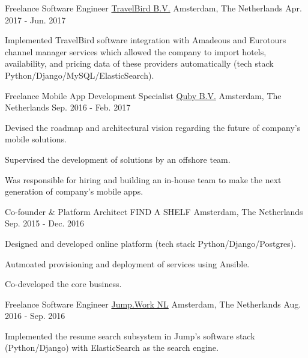 \begin{cventries}
  \cventry
    {Freelance Software Engineer} %
    {\href{https://travelbird.nl/}{TravelBird B.V.}} %
    {Amsterdam, The Netherlands} %
    {Apr. 2017 - 	Jun. 2017} %
    {
      \begin{cvitems} %
        \item {Implemented TravelBird software integration with Amadeous and Eurotours channel manager services which allowed the company to import hotels, availability, and pricing data of these providers automatically (tech stack Python/Django/MySQL/ElasticSearch).}
      \end{cvitems}
    }

  \cventry
    {Freelance Mobile App Development Specialist} %
    {\href{https://www.quby.com/}{Quby B.V.}} %
    {Amsterdam, The Netherlands} %
    {Sep. 2016 - Feb. 2017} %
    {
      \begin{cvitems} %
        \item {Devised the roadmap and architectural vision regarding the future of company's mobile solutions.}
        \item {Supervised the  development of solutions by an offshore team.}
        \item {Was responsible for hiring and building an in-house team to make the next generation of company's mobile apps.}
      \end{cvitems}
    }

  \cventry
    {Co-founder \& Platform  Architect} %
    {FIND A SHELF} %
    {Amsterdam, The Netherlands} %
    {Sep. 2015 - Dec. 2016} %
    {
      \begin{cvitems} %
        \item {Designed and developed online platform (tech stack Python/Django/Postgres).}
        \item {Autmoated provisioning and deployment of services using Ansible.}
        \item {Co-developed the core business.}
      \end{cvitems}
    }

  \cventry
    {Freelance Software Engineer} %
    {\href{https://jump.work/}{Jump.Work NL}} %
    {Amsterdam, The Netherlands} %
    {Aug. 2016 - Sep. 2016} %
    {
      \begin{cvitems} %
        \item {Implemented the resume search subsystem in Jump's software stack (Python/Django) with ElasticSearch as the search engine.}
      \end{cvitems}
    }


\end{cventries}
